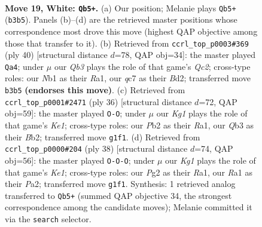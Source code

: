 \documentclass[11pt]{article}
\begin{document}
\clearpage

\begin{figure}[p]\centering
\begin{subfigure}{0.46\textwidth}\centering
\resizebox{\linewidth}{!}{%
\newchessgame
\chessboard[
  setfen={r1b1kb1r/2q3pp/1p6/p3p3/3p3P/1Q6/PP3PP1/RNB1R1K1 w q - 0 19},
  showmover=false,
  pgfstyle=straightmove, color=movearrow, markmove={b3-b5}
]}
\caption{}
\end{subfigure}\hfill
\begin{subfigure}{0.46\textwidth}\centering
\resizebox{\linewidth}{!}{%
\newchessgame
\chessboard[
  setfen={3qr1k1/5p1p/r1p3p1/p1P1b3/3p4/7P/PPQB1PP1/R3R1K1 w - - 0 21},
  showmover=false,
  pgfstyle=straightmove, color=movearrow, markmove={c2-a4}
]}
\caption{}
\end{subfigure}
\\[4pt]
\begin{subfigure}{0.46\textwidth}\centering
\resizebox{\linewidth}{!}{%
\newchessgame
\chessboard[
  setfen={r3kb1r/p1p3pp/1p6/1P1q1p2/Q3p3/P3P3/1B3PPP/R3K2R w KQkq - 0 19},
  showmover=false,
  pgfstyle=straightmove, color=movearrow, markmove={e1-g1}
]}
\caption{}
\end{subfigure}\hfill
\begin{subfigure}{0.46\textwidth}\centering
\resizebox{\linewidth}{!}{%
\newchessgame
\chessboard[
  setfen={r1b4r/2q1ppk1/p2p3p/8/1p4P1/4QP2/PPP1B3/R3K2R w Q - 0 20},
  showmover=false,
  pgfstyle=straightmove, color=movearrow, markmove={e1-c1}
]}
\caption{}
\end{subfigure}
\caption{\textbf{Move 19, White: \texttt{Qb5+}.} (a) Our position; Melanie plays \texttt{Qb5+} (\texttt{b3b5}). Panels (b)--(d) are the retrieved master positions whose correspondence most drove this move (highest QAP objective among those that transfer to it). (b) Retrieved from \texttt{ccrl\_top\_p0003\#369} (ply 40) [structural distance $d$=78, QAP obj=34]: the master played \texttt{Qa4}; under $\mu$ our \emph{Qb3} plays the role of that game's \emph{Qc2}; cross-type roles: our \emph{N}b1 as their \emph{R}a1, our \emph{q}c7 as their \emph{B}d2; transferred move \texttt{b3b5} \textbf{(endorses this move)}. (c) Retrieved from \texttt{ccrl\_top\_p0001\#2471} (ply 36) [structural distance $d$=72, QAP obj=59]: the master played \texttt{O-O}; under $\mu$ our \emph{Kg1} plays the role of that game's \emph{Ke1}; cross-type roles: our \emph{P}b2 as their \emph{R}a1, our \emph{Q}b3 as their \emph{B}b2; transferred move \texttt{g1f1}. (d) Retrieved from \texttt{ccrl\_top\_p0000\#204} (ply 38) [structural distance $d$=74, QAP obj=56]: the master played \texttt{O-O-O}; under $\mu$ our \emph{Kg1} plays the role of that game's \emph{Ke1}; cross-type roles: our \emph{P}g2 as their \emph{R}a1, our \emph{R}a1 as their \emph{P}a2; transferred move \texttt{g1f1}. Synthesis: 1 retrieved analog transferred to \texttt{Qb5+} (summed QAP objective 34, the strongest correspondence among the candidate moves); Melanie committed it via the \texttt{search} selector.}
\label{fig:thought-m36}
\end{figure}
\end{document}
